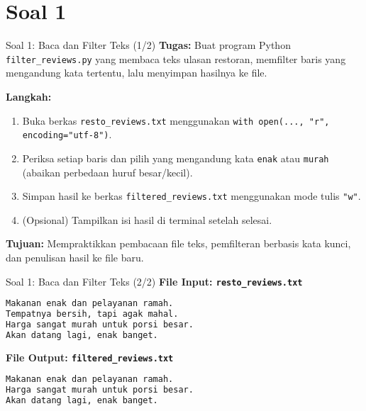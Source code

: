 \documentclass[aspectratio=169, table]{beamer}
\begin{document}
\section{Soal 1}
\begin{frame}[fragile]{Soal 1: Baca dan Filter Teks (1/2)}
\vspace{15pt}
\textbf{Tugas:}  
Buat program Python \texttt{filter\_reviews.py} yang membaca teks ulasan restoran, memfilter baris yang mengandung kata tertentu, lalu menyimpan hasilnya ke file.

\textbf{Langkah:}
\begin{enumerate}
  \item Buka berkas \texttt{resto\_reviews.txt} menggunakan \texttt{with open(..., "r", encoding="utf-8")}.
  \item Periksa setiap baris dan pilih yang mengandung kata \texttt{enak} atau \texttt{murah}  
        (abaikan perbedaan huruf besar/kecil).
  \item Simpan hasil ke berkas \texttt{filtered\_reviews.txt}  
        menggunakan mode tulis \texttt{"w"}.
  \item (Opsional) Tampilkan isi hasil di terminal setelah selesai.
\end{enumerate}

\textbf{Tujuan:}  
Mempraktikkan pembacaan file teks, pemfilteran berbasis kata kunci, dan penulisan hasil ke file baru.
\end{frame}

\begin{frame}[fragile]{Soal 1: Baca dan Filter Teks (2/2)}
\vspace{15pt}
\textbf{File Input: \texttt{resto\_reviews.txt}}
\begin{lstlisting}[language=bash,basicstyle=\ttfamily\small]
Makanan enak dan pelayanan ramah.
Tempatnya bersih, tapi agak mahal.
Harga sangat murah untuk porsi besar.
Akan datang lagi, enak banget.
\end{lstlisting}

\textbf{File Output: \texttt{filtered\_reviews.txt}}
\begin{lstlisting}[language=bash,basicstyle=\ttfamily\small]
Makanan enak dan pelayanan ramah.
Harga sangat murah untuk porsi besar.
Akan datang lagi, enak banget.
\end{lstlisting}
\end{frame}
\end{document}
